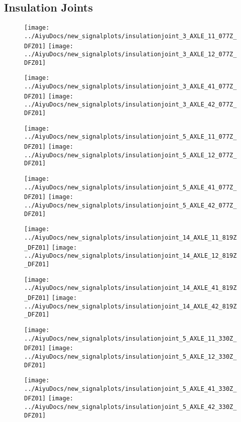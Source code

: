 \subsection{Insulation Joints}
\begin{figure}[H]
	\centering
	\texttt{[image: ../AiyuDocs/new\_signalplots/insulationjoint\_3\_AXLE\_11\_077Z\_DFZ01]}
	\texttt{[image: ../AiyuDocs/new\_signalplots/insulationjoint\_3\_AXLE\_12\_077Z\_DFZ01]}
	
	\texttt{[image: ../AiyuDocs/new\_signalplots/insulationjoint\_3\_AXLE\_41\_077Z\_DFZ01]}
	\texttt{[image: ../AiyuDocs/new\_signalplots/insulationjoint\_3\_AXLE\_42\_077Z\_DFZ01]}
\end{figure}

\begin{figure}[H]
	\centering
	\texttt{[image: ../AiyuDocs/new\_signalplots/insulationjoint\_5\_AXLE\_11\_077Z\_DFZ01]}
	\texttt{[image: ../AiyuDocs/new\_signalplots/insulationjoint\_5\_AXLE\_12\_077Z\_DFZ01]}
	
	\texttt{[image: ../AiyuDocs/new\_signalplots/insulationjoint\_5\_AXLE\_41\_077Z\_DFZ01]}
	\texttt{[image: ../AiyuDocs/new\_signalplots/insulationjoint\_5\_AXLE\_42\_077Z\_DFZ01]}
\end{figure}

\begin{figure}[H]
	\centering
	\texttt{[image: ../AiyuDocs/new\_signalplots/insulationjoint\_14\_AXLE\_11\_819Z\_DFZ01]}
	\texttt{[image: ../AiyuDocs/new\_signalplots/insulationjoint\_14\_AXLE\_12\_819Z\_DFZ01]}
	
	\texttt{[image: ../AiyuDocs/new\_signalplots/insulationjoint\_14\_AXLE\_41\_819Z\_DFZ01]}
	\texttt{[image: ../AiyuDocs/new\_signalplots/insulationjoint\_14\_AXLE\_42\_819Z\_DFZ01]}
\end{figure}

\begin{figure}[H]
	\centering
	\texttt{[image: ../AiyuDocs/new\_signalplots/insulationjoint\_5\_AXLE\_11\_330Z\_DFZ01]}
	\texttt{[image: ../AiyuDocs/new\_signalplots/insulationjoint\_5\_AXLE\_12\_330Z\_DFZ01]}
	
	\texttt{[image: ../AiyuDocs/new\_signalplots/insulationjoint\_5\_AXLE\_41\_330Z\_DFZ01]}
	\texttt{[image: ../AiyuDocs/new\_signalplots/insulationjoint\_5\_AXLE\_42\_330Z\_DFZ01]}
\end{figure}

